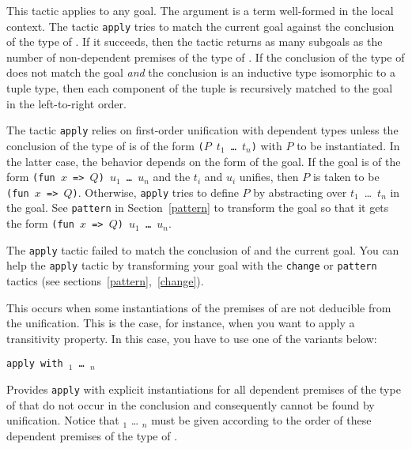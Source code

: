 \begin{coq_example*}
This tactic applies to any goal.  The argument {\term} is a term
well-formed in the local context.  The tactic {\tt apply} tries to
match the current goal against the conclusion of the type of {\term}.
If it succeeds, then the tactic returns as many subgoals as the number
of non-dependent premises of the type of {\term}. If the conclusion of
the type of {\term} does not match the goal {\em and} the conclusion
is an inductive type isomorphic to a tuple type, then each component
of the tuple is recursively matched to the goal in the left-to-right
order.

The tactic {\tt apply} relies on first-order unification with
dependent types unless the conclusion of the type of {\term} is of the
form {\tt ($P$ $t_1$ \dots\ $t_n$)} with $P$ to be instantiated.  In
the latter case, the behavior depends on the form of the goal. If the
goal is of the form {\tt (fun $x$ => $Q$)~$u_1$~\ldots~$u_n$} and the
$t_i$ and $u_i$ unifies, then $P$ is taken to be {\tt (fun $x$ => $Q$)}.
Otherwise, {\tt apply} tries to define $P$ by abstracting over
$t_1$~\ldots ~$t_n$ in the goal. See {\tt pattern} in
Section~\ref{pattern} to transform the goal so that it gets the form
{\tt (fun $x$ => $Q$)~$u_1$~\ldots~$u_n$}.

\begin{ErrMsgs}
\item {}

  The {\tt apply}
  tactic failed to match the conclusion of {\term} and the current goal.
  You can help the {\tt apply} tactic by transforming your
  goal with the {\tt change} or {\tt pattern} tactics (see
  sections~\ref{pattern},~\ref{change}).

\item {}

  This occurs when some instantiations of the premises of {\term} are not
  deducible from the unification. This is the case, for instance, when
  you want to apply a transitivity property. In this case, you have to
  use one of the variants below:

\end{ErrMsgs}

\begin{Variants}

\item{\tt apply {\term} with {\term$_1$} \dots\ {\term$_n$}}

  Provides {\tt apply} with explicit instantiations for all dependent
  premises of the type of {\term} that do not occur in the conclusion
  and consequently cannot be found by unification. Notice that
  {\term$_1$} \mbox{\dots} {\term$_n$} must be given according to the order
  of these dependent premises of the type of {\term}.


\end{Variants}
\end{coq_example*}
